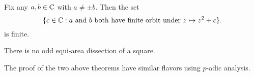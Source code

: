 \begin{theorem}
  Fix any $a, b \in \mathbb{C}$ with $a \ne \pm b$.
  Then the set
  \[
    \{c \in \mathbb{C} : \text{$a$ and $b$ both have finite orbit under $z \mapsto z^2 + c$}\}.
  \]
  is finite.
\end{theorem}

\begin{theorem}[Monsky]
  There is no odd equi-area dissection of a square.
\end{theorem}

\begin{remark}
  The proof of the two above theorems have similar
  flavors using $p$-adic analysis.
\end{remark}
